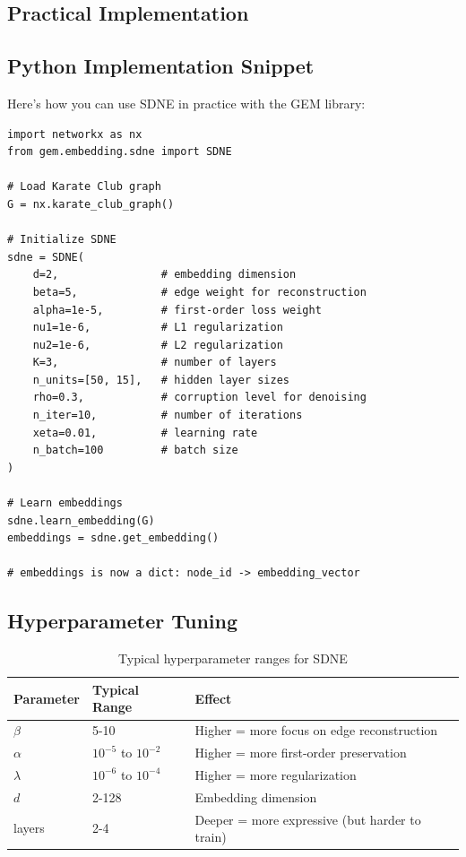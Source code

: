 \begin{notechapter}
\section{Practical Implementation}

\subsection{Python Implementation Snippet}

Here's how you can use SDNE in practice with the GEM library:

\begin{verbatim}
import networkx as nx
from gem.embedding.sdne import SDNE

# Load Karate Club graph
G = nx.karate_club_graph()

# Initialize SDNE
sdne = SDNE(
    d=2,                # embedding dimension
    beta=5,             # edge weight for reconstruction
    alpha=1e-5,         # first-order loss weight
    nu1=1e-6,           # L1 regularization
    nu2=1e-6,           # L2 regularization
    K=3,                # number of layers
    n_units=[50, 15],   # hidden layer sizes
    rho=0.3,            # corruption level for denoising
    n_iter=10,          # number of iterations
    xeta=0.01,          # learning rate
    n_batch=100         # batch size
)

# Learn embeddings
sdne.learn_embedding(G)
embeddings = sdne.get_embedding()

# embeddings is now a dict: node_id -> embedding_vector
\end{verbatim}

\subsection{Hyperparameter Tuning}

\begin{table}[h]
\centering
\begin{tabular}{@{}lll@{}}
\toprule
\textbf{Parameter} & \textbf{Typical Range} & \textbf{Effect} \\ \midrule
$\beta$ & 5-10 & Higher = more focus on edge reconstruction \\
$\alpha$ & $10^{-5}$ to $10^{-2}$ & Higher = more first-order preservation \\
$\lambda$ & $10^{-6}$ to $10^{-4}$ & Higher = more regularization \\
$d$ & 2-128 & Embedding dimension \\
layers & 2-4 & Deeper = more expressive (but harder to train) \\ \bottomrule
\end{tabular}
\caption{Typical hyperparameter ranges for SDNE}
\end{table}


\end{notechapter}
